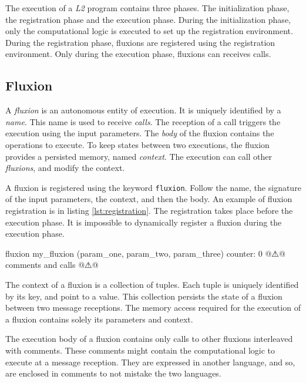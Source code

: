 The execution of a \textit{L2} program contains three phases.
The initialization phase, the registration phase and the execution phase.
During the initialization phase, only the computational logic is executed to set up the registration environment.
During the registration phase, fluxions are registered using the registration environment.
Only during the execution phase, fluxions can receives calls.

\subsection{Fluxion}

A \textit{fluxion} is an autonomous entity of execution.
It is uniquely identified by a \textit{name}.
This name is used to receive \textit{calls}.
The reception of a call triggers the execution using the input parameters.
The \textit{body} of the fluxion contains the operations to execute.
To keep states between two executions, the fluxion provides a persisted memory, named \textit{context}.
The execution can call other \textit{fluxions}, and modify the context.

A fluxion is registered using the keyword \texttt{fluxion}.
Follow the name, the signature of the input parameters, the context, and then the body.
An example of fluxion registration is in listing \ref{lst:registration}.
The registration takes place before the execution phase.
It is impossible to dynamically register a fluxion during the execution phase.

\begin{code}[flx, %
             caption={Registration of a fluxion}, %
             label={lst:registration}] %

fluxion my_fluxion (param_one, param_two, param_three) {
  counter: 0
} {
  @$\warning$@ comments and calls @$\warning$@
}
 
\end{code}

The context of a fluxion is a collection of tuples.
Each tuple is uniquely identified by its key, and point to a value.
This collection persists the state of a fluxion between two message receptions.
The memory access required for the execution of a fluxion contains solely its parameters and context.

The execution body of a fluxion contains only calls to other fluxions interleaved with comments.
These comments might contain the computational logic to execute at a message reception.
They are expressed in another language, and so, are enclosed in comments to not mistake the two languages.

